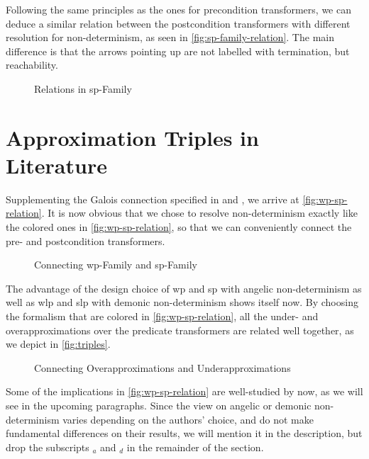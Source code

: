Following the same principles as the ones for precondition transformers, we can deduce a similar relation between the postcondition transformers with different resolution for non-determinism, as seen in \autoref{fig:sp-family-relation}. 
The main difference is that the arrows pointing up are not labelled with termination, but reachability. 

\begin{figure}[ht]
	\centering
	
	\caption{Relations in sp-Family}
	\label{fig:sp-family-relation}
\end{figure}

\section{Approximation Triples in Literature}\label{sec:literature} 
Supplementing the Galois connection specified in  and , we arrive at \autoref{fig:wp-sp-relation}. 
It is now obvious that we chose to resolve non-determinism exactly like the colored ones in \autoref{fig:wp-sp-relation}, so that we can conveniently connect the pre- and postcondition transformers. 

\begin{figure}[h]
	\centering
	
	\caption{Connecting wp-Family and sp-Family}
	\label{fig:wp-sp-relation}
\end{figure}

The advantage of the design choice of wp and sp with angelic non-determinism as well as wlp and slp with demonic non-determinism shows itself now. 
By choosing the formalism that are colored in \autoref{fig:wp-sp-relation}, all the under- and overapproximations over the predicate transformers are related well together, as we depict in \autoref{fig:triples}.
\begin{figure}[h]
	\centering
	
	\caption{Connecting Overapproximations and Underapproximations}
	\label{fig:triples}
\end{figure}

Some of the implications in \autoref{fig:wp-sp-relation} are well-studied by now, as we will see in the upcoming paragraphs. 
Since the view on angelic or demonic non-determinism varies depending on the authors' choice, and do not make fundamental differences on their results, we will mention it in the description, but drop the subscripts $_a$ and $_d$ in the remainder of the section. 

